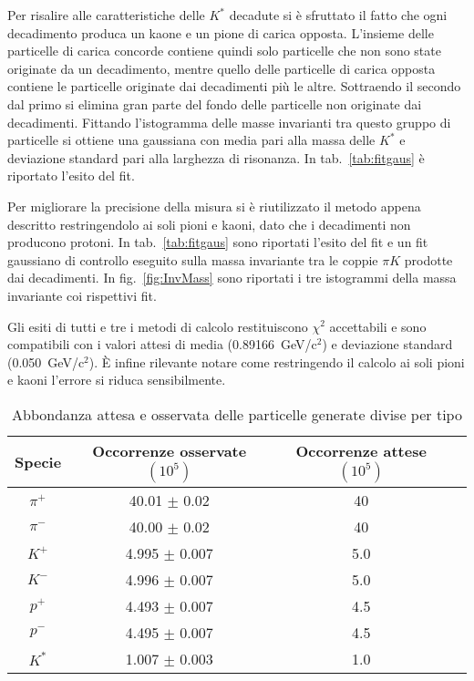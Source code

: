 \documentclass[a4paper,10pt]{article}
\begin{document}
Per risalire alle caratteristiche delle $K^*$ decadute si è sfruttato il fatto che ogni decadimento produca un kaone e un pione di carica opposta. L'insieme delle particelle di carica concorde contiene quindi solo particelle che non sono state originate da un decadimento, mentre quello delle particelle di carica opposta contiene le particelle originate dai decadimenti più le altre. Sottraendo il secondo dal primo si elimina gran parte del fondo delle particelle non originate dai decadimenti. Fittando l'istogramma delle masse invarianti tra questo gruppo di particelle si ottiene una gaussiana con media pari alla massa delle $K^*$ e deviazione standard pari alla larghezza di risonanza. In tab.~\ref{tab:fitgaus} è riportato l'esito del fit.

Per migliorare la precisione della misura si è riutilizzato il metodo appena descritto restringendolo ai soli pioni e kaoni, dato che i decadimenti non producono protoni. In tab.~\ref*{tab:fitgaus} sono riportati l'esito del fit e un fit gaussiano di controllo eseguito sulla massa invariante tra le coppie $\pi K$ prodotte dai decadimenti. In fig.~\ref*{fig:InvMass} sono riportati i tre istogrammi della massa invariante coi rispettivi fit.

Gli esiti di tutti e tre i metodi di calcolo restituiscono $\chi^2$ accettabili e sono compatibili con i valori attesi di media (0.89166~GeV/c$^2$) e deviazione standard (0.050~GeV/c$^2$).
È infine rilevante notare come restringendo il calcolo ai soli pioni e kaoni l'errore si riduca sensibilmente.

\begin{table}
  \caption{Abbondanza attesa e osservata delle particelle generate divise per tipo}
  \label{tab:abbondanza}
  \centering
  \begin{tabular}{cccc}
    \toprule
    Specie  & Occorrenze osservate $(10^5)$ & Occorrenze attese $(10^5)$ \\
    \midrule
    $\pi^+$ & 40.01 $\pm$ 0.02              & 40                         \\
    $\pi^-$ & 40.00 $\pm$ 0.02              & 40                         \\
    $K^+$   & 4.995 $\pm$ 0.007             & 5.0                        \\
    $K^-$   & 4.996 $\pm$ 0.007             & 5.0                        \\
    $p^+$   & 4.493 $\pm$ 0.007             & 4.5                        \\
    $p^-$   & 4.495 $\pm$ 0.007             & 4.5                        \\
    $K^*$   & 1.007 $\pm$ 0.003             & 1.0                        \\
    \bottomrule
  \end{tabular}
\end{table}
\end{document}
